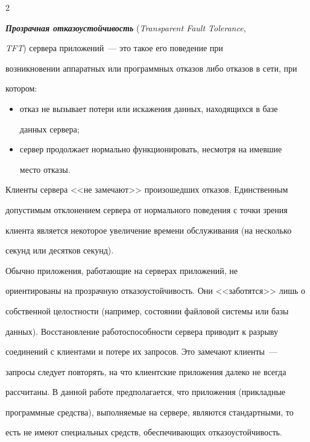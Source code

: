\begin{multicols}{2}
{\begin{itemize}
\end{itemize}



{\bfseries\textit{Прозрачная отказоустойчивость}} (\textit{Transparent Fault Tolerance},

\textit{TFT}) сервера приложений~--- это такое его поведение при

возникновении аппаратных или программных отказов либо отказов в сети, при

котором:

\begin{itemize}

\item отказ не вызывает потери или искажения данных, находящихся в базе

данных сервера;

\item сервер продолжает нормально функционировать, несмотря на имевшие

место отказы.

\end{itemize}



Клиенты сервера <<не замечают>> произошедших отказов. Единственным

допустимым отклонением сервера от нормального поведения с точки зрения

клиента является некоторое увеличение времени обслуживания (на несколько

секунд или десятков секунд).



Обычно приложения, работающие на серверах приложений, не

ориентированы на прозрачную отказоустойчивость. Они <<заботятся>> лишь о

собственной целостности (например, состоянии файловой системы или базы

данных). Восстановление работоспособности сервера приводит к разрыву

соединений с клиентами и потере их запросов. Это замечают клиенты~---

запросы следует повторять, на что клиентские приложения далеко не всегда

рассчитаны. В данной работе предполагается, что приложения (прикладные

программные средства), выполняемые на сервере, являются стандартными, то

есть не имеют специальных средств, обеспечивающих отказоустойчивость.



}
\end{multicols}
